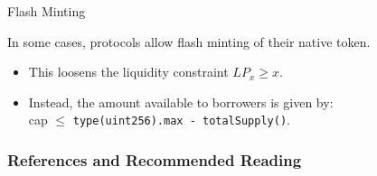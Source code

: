 \documentclass[]{beamer}
\begin{document}
\begin{frame}{Flash Minting}

	In some cases, protocols allow flash minting of their native token. \vspace{0.5em}
	
	\begin{itemize}
		\item This loosens the liquidity constraint $LP_x \geq x$. 
		\item Instead, the amount available to borrowers is given by:\\
			cap $\leq$ \texttt{type(uint256).max - totalSupply()}.
	\end{itemize}
	
	\vspace{1em}
	
	
\end{frame}

\begin{frame}%

\frametitle{References and Recommended Reading}

	
	
\end{frame}
\end{document}
